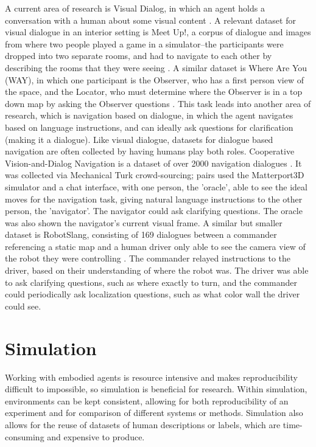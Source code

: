 A current area of research is Visual Dialog, in which an agent holds a conversation with a human about some visual content \cite{das2017}. A relevant dataset for visual dialogue in an interior setting is Meet Up!, a corpus of dialogue and images from where two people played a game in a simulator--the participants were dropped into two separate rooms, and had to navigate to each other by describing the rooms that they were seeing \cite{meetup}. A similar dataset is Where Are You (WAY), in which one participant is the Observer, who has a first person view of the space, and the Locator, who must determine where the Observer is in a top down map by asking the Observer questions \cite{whereareyou}. This task leads into another area of research, which is navigation based on dialogue, in which the agent navigates based on language instructions, and can ideally ask questions for clarification (making it a dialogue). Like visual dialogue, datasets for dialogue based navigation are often collected by having humans play both roles. Cooperative Vision-and-Dialog Navigation is a dataset of over 2000 navigation dialogues \cite{thomason2019visionanddialog}. It was collected via Mechanical Turk crowd-sourcing; pairs used the Matterport3D simulator and a chat interface, with one person, the ’oracle’, able to see the ideal moves for the navigation task, giving natural language instructions to the other person, the ’navigator'. The navigator could ask clarifying questions. The oracle was also shown the navigator's current visual frame. \newline
A similar but smaller dataset is RobotSlang, consisting of 169 dialogues between a commander referencing a static map and a human driver only able to see the camera view of the robot they were controlling \cite{robotslang}. The commander relayed instructions to the driver, based on their understanding of where the robot was. The driver was able to ask clarifying questions, such as where exactly to turn, and the commander could periodically ask localization questions, such as what color wall the driver could see. \newline
\section{Simulation}
Working with embodied agents is resource intensive and makes reproducibility difficult to impossible, so simulation is beneficial for research. Within simulation, environments can be kept consistent, allowing for both reproducibility of an experiment and for comparison of different systems or methods. Simulation also allows for the reuse of datasets of human descriptions or labels, which are time-consuming and expensive to produce.

